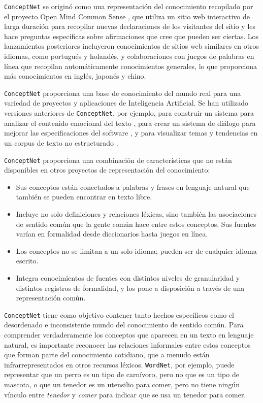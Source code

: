\texttt{ConceptNet} se originó como una representación del conocimiento recopilado por el proyecto Open Mind Common Sense \cite{singh2002open}, que utiliza un sitio web interactivo de larga duración para recopilar nuevas declaraciones de los visitantes del sitio y les hace preguntas específicas sobre afirmaciones que cree que pueden ser ciertas.
Los lanzamientos posteriores incluyeron conocimientos de sitios web similares en otros idiomas, como portugués y holandés, y colaboraciones con juegos de palabras en línea que recopilan automáticamente conocimientos generales, lo que proporciona más conocimientos en inglés, japonés y chino.

\texttt{ConceptNet} proporciona una base de conocimiento del mundo real para una variedad de proyectos y aplicaciones de Inteligencia Artificial.
Se han utilizado versiones anteriores de \texttt{ConceptNet}, por ejemplo, para construir un sistema para analizar el contenido emocional del texto \cite{cambria2010senticnet}, para crear un sistema de diálogo para mejorar las especificaciones del software \cite{korner2009natural}, y para visualizar temas y tendencias en un corpus de texto no estructurado \cite{speer2010finding}.

\texttt{ConceptNet} proporciona una combinación de características que no están disponibles en otros proyectos de representación del conocimiento:
\begin{itemize}
  \item Sus conceptos están conectados a palabras y frases en lenguaje natural que también se pueden encontrar en texto libre.
  \item Incluye no solo definiciones y relaciones léxicas, sino también las asociaciones de sentido común que la gente común hace entre estos conceptos. Sus fuentes varían en formalidad desde diccionarios hasta juegos en línea.
  \item Los conceptos no se limitan a un solo idioma; pueden ser de cualquier idioma escrito.
  \item Integra conocimientos de fuentes con distintos niveles de granularidad y distintos registros de formalidad, y los pone a disposición a través de una representación común.
\end{itemize}

\texttt{ConceptNet} tiene como objetivo contener tanto hechos específicos como el desordenado e inconsistente mundo del conocimiento de sentido común.
Para comprender verdaderamente los conceptos que aparecen en un texto en lenguaje natural, es importante reconocer las relaciones informales entre estos conceptos que forman parte del conocimiento cotidiano, que a menudo están infrarrepresentados en otros recursos léxicos.
\texttt{WordNet}, por ejemplo, puede representar que un perro es un tipo de carnívoro, pero no que es un tipo de mascota, o que un tenedor es un utensilio para comer, pero no tiene ningún vínculo entre \textit{tenedor} y \textit{comer} para indicar que se usa un tenedor para comer.

